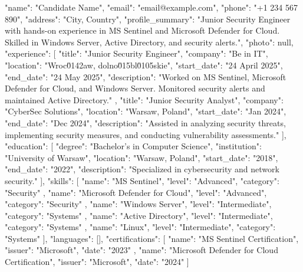 {
  "name": "Candidate Name",
  "email": "email@example.com",
  "phone": "+1 234 567 890",
  "address": "City, Country",
  "profile_summary": "Junior Security Engineer with hands-on experience in MS Sentinel and Microsoft Defender for Cloud. Skilled in Windows Server, Active Directory, and security alerts.",
  "photo": null,
  "experience": [
    {
      "title": "Junior Security Engineer",
      "company": "Be in IT",
      "location": "Wroc\u0142aw, dolno\u015bl\u0105skie",
      "start_date": "24 April 2025",
      "end_date": "24 May 2025",
      "description": "Worked on MS Sentinel, Microsoft Defender for Cloud, and Windows Server. Monitored security alerts and maintained Active Directory."
    },
    {
      "title": "Junior Security Analyst",
      "company": "CyberSec Solutions",
      "location": "Warsaw, Poland",
      "start_date": "Jan 2024",
      "end_date": "Dec 2024",
      "description": "Assisted in analyzing security threats, implementing security measures, and conducting vulnerability assessments."
    }
  ],
  "education": [
    {
      "degree": "Bachelor's in Computer Science",
      "institution": "University of Warsaw",
      "location": "Warsaw, Poland",
      "start_date": "2018",
      "end_date": "2022",
      "description": "Specialized in cybersecurity and network security."
    }
  ],
  "skills": [
    {
      "name": "MS Sentinel",
      "level": "Advanced",
      "category": "Security"
    },
    {
      "name": "Microsoft Defender for Cloud",
      "level": "Advanced",
      "category": "Security"
    },
    {
      "name": "Windows Server",
      "level": "Intermediate",
      "category": "Systems"
    },
    {
      "name": "Active Directory",
      "level": "Intermediate",
      "category": "Systems"
    },
    {
      "name": "Linux",
      "level": "Intermediate",
      "category": "Systems"
    }
  ],
  "languages": [],
  "certifications": [
    {
      "name": "MS Sentinel Certification",
      "issuer": "Microsoft",
      "date": "2023"
    },
    {
      "name": "Microsoft Defender for Cloud Certification",
      "issuer": "Microsoft",
      "date": "2024"
    }
  ]
}